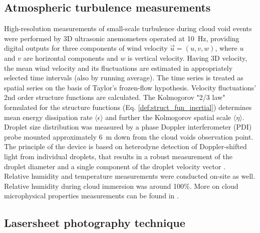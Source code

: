 \documentclass[../main.tex]{subfiles}
\begin{document}
\subsection{Atmospheric turbulence measurements}
\label{subs:atmosmeas}
High-resolution measurements of small-scale turbulence during cloud void events were performed by 3D ultrasonic anemometers operated at 10~Hz, providing digital outputs for three components of wind velocity $\vec{u}=(u,v,w)$, where $u$ and $v$ are horizontal components and $w$ is vertical velocity. Having 3D velocity, the mean wind velocity and its fluctuations are estimated in appropriately selected time intervals (also by running average). The time series is treated as spatial series on the basis of Taylor’s frozen-flow hypothesis. Velocity fluctuations' 2nd order structure functions are calculated. The Kolmogorov "2/3 law" formulated for the structure functions (Eq. \ref{def:struct_fun_inertial}) determines mean energy dissipation rate $\langle\epsilon\rangle$ and further the Kolmogorov spatial scale $\langle\eta\rangle$.\\
Droplet size distribution was measured by a phase Doppler interferometer (PDI) probe mounted approximately 6~m down from the cloud voids observation point. The principle of the device is based on heterodyne detection of Doppler-shifted light from individual droplets, that results in a robust measurement of the droplet diameter and a single component of the droplet velocity vector \citep{Chuang2008}.\\
Relative humidity and temperature measurements were conducted on-site as well. Relative humidity during cloud immersion was around 100\%. More on cloud microphysical properties measurements can be found in \citet{Siebert2015}.\\

\subsection{Lasersheet photography technique}
\end{document}
